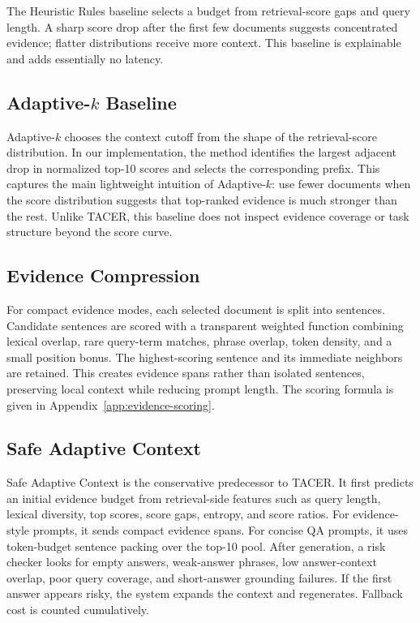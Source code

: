 \documentclass[11pt]{article}
\begin{document}
The Heuristic Rules baseline selects a budget from retrieval-score gaps and query length. A sharp score drop after the first few documents suggests concentrated evidence; flatter distributions receive more context. This baseline is explainable and adds essentially no latency.

\subsection{Adaptive-$k$ Baseline}

Adaptive-$k$ chooses the context cutoff from the shape of the retrieval-score distribution. In our implementation, the method identifies the largest adjacent drop in normalized top-10 scores and selects the corresponding prefix. This captures the main lightweight intuition of Adaptive-$k$: use fewer documents when the score distribution suggests that top-ranked evidence is much stronger than the rest. Unlike TACER, this baseline does not inspect evidence coverage or task structure beyond the score curve.

\subsection{Evidence Compression}

For compact evidence modes, each selected document is split into sentences. Candidate sentences are scored with a transparent weighted function combining lexical overlap, rare query-term matches, phrase overlap, token density, and a small position bonus. The highest-scoring sentence and its immediate neighbors are retained. This creates evidence spans rather than isolated sentences, preserving local context while reducing prompt length. The scoring formula is given in Appendix~\ref{app:evidence-scoring}.

\subsection{Safe Adaptive Context}

Safe Adaptive Context is the conservative predecessor to TACER. It first predicts an initial evidence budget from retrieval-side features such as query length, lexical diversity, top scores, score gaps, entropy, and score ratios. For evidence-style prompts, it sends compact evidence spans. For concise QA prompts, it uses token-budget sentence packing over the top-10 pool. After generation, a risk checker looks for empty answers, weak-answer phrases, low answer-context overlap, poor query coverage, and short-answer grounding failures. If the first answer appears risky, the system expands the context and regenerates. Fallback cost is counted cumulatively.
\end{document}

